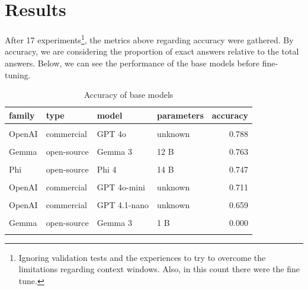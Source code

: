 \documentclass[
  12pt,
]{article}
\begin{document}
\section{Results}\label{sec-results}

After 17 experiments\footnote{Ignoring validation tests and the
  experiences to try to overcome the limitations regarding context
  windows. Also, in this count there were the fine tune.}, the metrics
above regarding accuracy were gathered. By accuracy, we are considering
the proportion of exact answers relative to the total answers. Below, we
can see the performance of the base models before fine-tuning.

\begin{longtable}[t]{llllr}

\toprule
family & type & model & parameters & accuracy\\
\midrule
\cellcolor{gray!10}{Gemma} & \cellcolor{gray!10}{open-source} & \cellcolor{gray!10}{Gemma 3} & \cellcolor{gray!10}{27 B} & \cellcolor{gray!10}{0.820}\\
OpenAI & commercial & GPT 4o & unknown & 0.788\\
\cellcolor{gray!10}{OpenAI} & \cellcolor{gray!10}{commercial} & \cellcolor{gray!10}{o3-mini} & \cellcolor{gray!10}{unknown} & \cellcolor{gray!10}{0.764}\\
Gemma & open-source & Gemma 3 & 12 B & 0.763\\
\cellcolor{gray!10}{OpenAI} & \cellcolor{gray!10}{commercial} & \cellcolor{gray!10}{GPT 4.1} & \cellcolor{gray!10}{unknown} & \cellcolor{gray!10}{0.755}\\
\addlinespace
Phi & open-source & Phi 4 & 14 B & 0.747\\
\cellcolor{gray!10}{Llama} & \cellcolor{gray!10}{open-source} & \cellcolor{gray!10}{Llama 3.1} & \cellcolor{gray!10}{8 B} & \cellcolor{gray!10}{0.735}\\
OpenAI & commercial & GPT 4o-mini & unknown & 0.711\\
\cellcolor{gray!10}{OpenAI} & \cellcolor{gray!10}{commercial} & \cellcolor{gray!10}{GPT 4.1-mini} & \cellcolor{gray!10}{unknown} & \cellcolor{gray!10}{0.697}\\
OpenAI & commercial & GPT 4.1-nano & unknown & 0.659\\
\addlinespace
\cellcolor{gray!10}{Llama} & \cellcolor{gray!10}{open-source} & \cellcolor{gray!10}{Llama 3.2} & \cellcolor{gray!10}{3 B} & \cellcolor{gray!10}{0.542}\\
Gemma & open-source & Gemma 3 & 1 B & 0.000\\
\bottomrule


\caption{\label{tbl-accuracy-metadata}Accuracy of base models}

\tabularnewline
\end{longtable}
\end{document}
